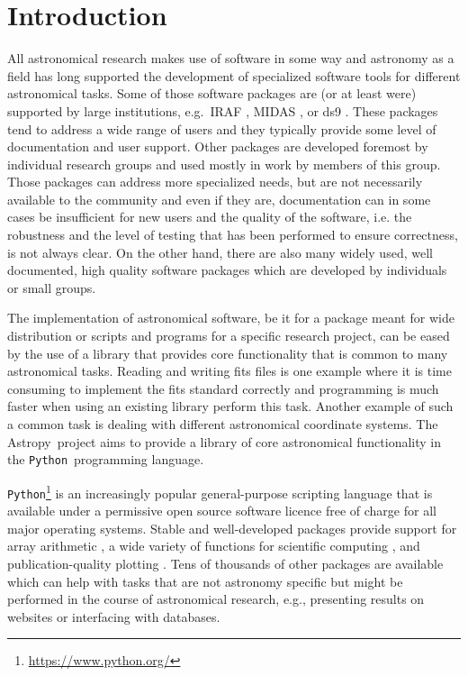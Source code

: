 \documentclass[modern]{aastex61}
\newcommand{\package}[1]{\texttt{#1}}
\newcommand{\python}{\package{Python}}
\newcommand{\astropy}{Astropy}
\begin{document}
\section{Introduction} \label{sec:intro}
All astronomical research makes use of software in some way and
astronomy as a field has long supported the development of specialized
software tools for different astronomical tasks. Some of those
software packages are (or at least were) supported by large
institutions, e.g.\ IRAF \citep[developed at NOAO,][]{IRAF}, MIDAS
\citep[developed at ESO,][]{MIDAS}, or ds9 \citep[developed at
%
%
  SAO,][]{ds9}. These packages tend to address a wide range of users
and they typically provide some level of documentation and user
support. Other packages are developed foremost by individual research
groups and used mostly in work by members of this group. Those
packages can address more specialized needs, but are not necessarily
available to the community and even if they are, documentation can in
some cases be insufficient for new users and the quality of the
software, i.e. the robustness and the level of testing that has been
performed to ensure correctness, is not always clear. On the other
hand, there are also many widely used, well documented, high quality
software packages which are developed by individuals or small groups.

The implementation of astronomical software, be it for a package meant
for wide distribution or scripts and programs for a specific research
project, can be eased by the use of a library that provides core
functionality that is common to many astronomical tasks. Reading and
writing fits files is one example where it is time
consuming to implement the fits standard correctly and
programming is much faster when using an existing library perform this
task. Another example of such a common task is dealing with different
astronomical coordinate systems. The \astropy\ project aims to provide a
library of core astronomical functionality in the \python\ programming
language.

\python\footnote{\url{https://www.python.org/}} is an increasingly popular
general-purpose scripting language that is available under a permissive open
source software licence free of charge for all major operating systems. Stable
and well-developed packages provide support for array arithmetic
\citep[\package{numpy},][]{numpy}, a wide variety of functions for scientific
computing \citep[\package{scipy},][]{numpy}, and publication-quality plotting
\citep[\package{matplotlib},][]{matplotlib}. Tens of thousands of other packages
are available which can help with tasks that are not astronomy specific but
might be performed in the course of astronomical research, e.g., presenting
results on websites or interfacing with databases.
\end{document}
